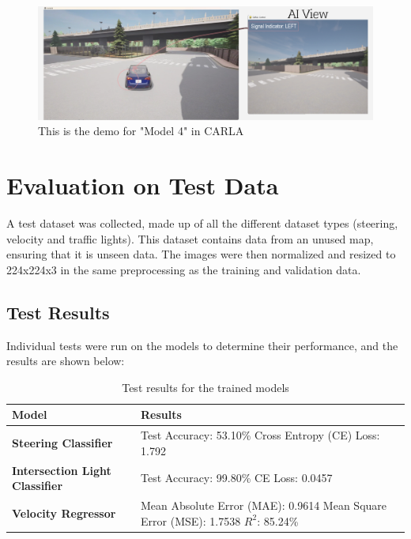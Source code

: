 \documentclass{article} %
\begin{document}
\begin{figure}[H] %
    \centering
    \includegraphics[width=1.0\textwidth]{model4demo.png} %
    \caption{This is the demo for "Model 4" in CARLA}
    \label{fig:model4demo}
\end{figure}


\section{Evaluation on Test Data}
A test dataset was collected, made up of all the different dataset types (steering, velocity and traffic lights). 
This dataset contains data from an unused map, ensuring that it is unseen data.
The images were then normalized and resized to 224x224x3 in the same preprocessing as the training and validation data.

\subsection{Test Results}
Individual tests were run on the models to determine their performance, and the results are shown below:

\begin{table}[h]
\centering
\caption{Test results for the trained models}
\vspace{0.5em}
\begin{tabular}{|p{4cm}|p{9cm}|}
\hline
\textbf{Model} & \textbf{Results} \\ \hline
\textbf{Steering Classifier} & 
Test Accuracy: 53.10\% \newline
Cross Entropy (CE) Loss: 1.792 \\ \hline
\textbf{Intersection Light Classifier} & 
Test Accuracy: 99.80\% \newline
CE Loss: 0.0457 \\ \hline
\textbf{Velocity Regressor} & 
Mean Absolute Error (MAE): 0.9614 \newline
Mean Square Error (MSE): 1.7538 \newline
$R^2$: 85.24\% \\ \hline
\end{tabular}
\end{table}
\end{document}
